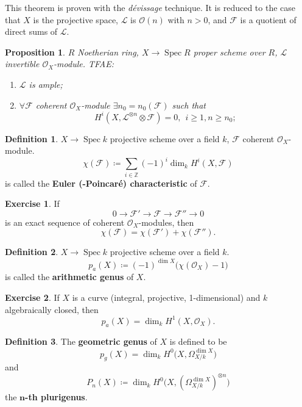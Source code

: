\documentclass[12pt]{article}
\DeclareMathOperator{\Spec}{Spec}
\newtheorem*{proposition}{Proposition}
\theoremstyle{definition}
\newtheorem*{definition}{Definition}
\newtheorem*{exercise}{Exercise}
\begin{document}
This theorem is proven with the \emph{d\'{e}vissage} technique. It is reduced to the case that $X$ is the projective space, $\mathcal{L}$ is $\mathcal{O}(n)$ with $n>0$, and $\mathcal{F}$ is a quotient of direct sums of $\mathcal{L}$.

\begin{proposition}
$R$ Noetherian ring, $X\rightarrow\Spec R$ proper scheme over $R$, $\mathcal{L}$ invertible $\mathcal{O}_X$-module. TFAE:
\begin{enumerate}[label=\arabic*)]
\item $\mathcal{L}$ is ample;
\item $\forall \mathcal{F}$ coherent $\mathcal{O}_X$-module $\exists n_0=n_0(\mathcal{F})$ such that
\[H^i(X,\mathcal{L}^{\otimes n}\otimes\mathcal{F})=0,\ \ i\geq1,n\geq n_0;\]
\end{enumerate}
\end{proposition}

\begin{definition}
$X\rightarrow\Spec k$ projective scheme over a field $k$, $\mathcal{F}$ coherent $\mathcal{O}_X$-module.
\[\chi(\mathcal{F})\coloneqq\sum_{i\in\mathbb{Z}}(-1)^i\dim_kH^i(X,\mathcal{F})\]
is called the \textbf{Euler (-Poincar\'{e}) characteristic} of $\mathcal{F}$.
\end{definition}

\begin{exercise}
If
\[0\longrightarrow\mathcal{F}'\longrightarrow\mathcal{F}\longrightarrow\mathcal{F}''\longrightarrow0\]
is an exact sequence of coherent $\mathcal{O}_X$-modules, then
\[\chi(\mathcal{F})=\chi(\mathcal{F}')+\chi(\mathcal{F}'').\]
\end{exercise}

\begin{definition}
$X\rightarrow\Spec k$ projective scheme over a field $k$.
\[p_a(X)\coloneqq(-1)^{\dim X}\big(\chi(\mathcal{O}_X)-1\big)\]
is called the \textbf{arithmetic genus} of $X$.
\end{definition}

\begin{exercise}
If $X$ is a curve (integral, projective, 1-dimensional) and $k$ algebraically closed, then
\[p_a(X)=\dim_kH^1(X,\mathcal{O}_X).\]
\end{exercise}

\begin{definition}
The \textbf{geometric genus} of $X$ is defined to be
\[p_g(X)=\dim_kH^0\big(X,\Omega_{X/k}^{\dim X}\big)\]
and
\[P_n(X)\coloneqq\dim_kH^0(X,(\Omega_{X/k}^{\dim X})^{\otimes n}\big)\]
the $\boldsymbol{n}$\textbf{-th plurigenus}.
\end{definition}
\end{document}
